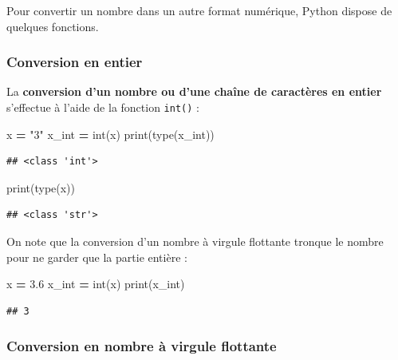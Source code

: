\documentclass[
  12pt,
]{book}
\newenvironment{Shaded}{\begin{snugshade}}{\end{snugshade}}
\newcommand{\BuiltInTok}[1]{#1}
\newcommand{\FloatTok}[1]{\textcolor[rgb]{0.00,0.00,0.81}{#1}}
\newcommand{\NormalTok}[1]{#1}
\newcommand{\OperatorTok}[1]{\textcolor[rgb]{0.81,0.36,0.00}{\textbf{#1}}}
\newcommand{\StringTok}[1]{\textcolor[rgb]{0.31,0.60,0.02}{#1}}
\numberwithin{equation}{section}
\numberwithin{countremarque}{section}
\begin{document}
Pour convertir un nombre dans un autre format numérique, Python dispose de quelques fonctions.

\subsubsection{Conversion en entier}\label{conversion-en-entier}

La \textbf{conversion d'un nombre ou d'une chaîne de caractères en entier} s'effectue à l'aide de la fonction \texttt{int()} :

\begin{Shaded}
\begin{Highlighting}[]
\NormalTok{x }\OperatorTok{=} \StringTok{"3"}
\NormalTok{x\_int }\OperatorTok{=} \BuiltInTok{int}\NormalTok{(x)}
\BuiltInTok{print}\NormalTok{(}\BuiltInTok{type}\NormalTok{(x\_int))}
\end{Highlighting}
\end{Shaded}

\begin{lstlisting}
## <class 'int'>
\end{lstlisting}

\begin{Shaded}
\begin{Highlighting}[]
\BuiltInTok{print}\NormalTok{(}\BuiltInTok{type}\NormalTok{(x))}
\end{Highlighting}
\end{Shaded}

\begin{lstlisting}
## <class 'str'>
\end{lstlisting}

On note que la conversion d'un nombre à virgule flottante tronque le nombre pour ne garder que la partie entière :

\begin{Shaded}
\begin{Highlighting}[]
\NormalTok{x }\OperatorTok{=} \FloatTok{3.6}
\NormalTok{x\_int }\OperatorTok{=} \BuiltInTok{int}\NormalTok{(x)}
\BuiltInTok{print}\NormalTok{(x\_int)}
\end{Highlighting}
\end{Shaded}

\begin{lstlisting}
## 3
\end{lstlisting}

\subsubsection{Conversion en nombre à virgule flottante}\label{conversion-en-nombre-uxe0-virgule-flottante}
\end{document}
